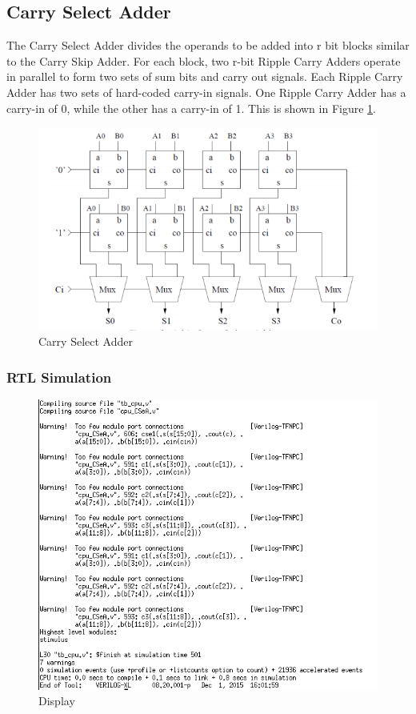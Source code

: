 \documentclass[12pt]{article}
\begin{document}
\subsection{Carry Select Adder}
The Carry Select Adder divides the operands to be added into r bit blocks similar to the Carry Skip Adder. For each block, two r-bit Ripple Carry Adders operate in parallel to form two sets of sum bits and carry out signals. Each Ripple Carry Adder has two sets of hard-coded carry-in signals. One Ripple Carry Adder has a carry-in of 0, while the other has a carry-in of 1. This is shown in Figure \ref{fig:carry-select}.

\begin{figure}[H]
\centering
\includegraphics[width=0.7\linewidth]{carry-select}
\caption{Carry Select Adder}
\label{fig:carry-select}
\end{figure}

\subsubsection{RTL Simulation}
\begin{figure}[H]
\centering
\includegraphics[width=.7\linewidth]{../CSeA/CSeA-text}
\caption{Display}
\label{fig:CSeA-text}
\end{figure}
\end{document}

